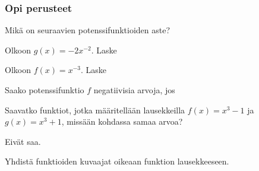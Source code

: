 \begin{tehtavasivu}

\subsubsection*{Opi perusteet}

\begin{tehtava}
Mikä on seuraavien potenssifunktioiden aste?
\begin{vastaus}
\end{vastaus}
\end{tehtava}

\begin{tehtava}
Olkoon $g(x)=-2x^{-2}$. Laske
\begin{vastaus}
\end{vastaus}
\end{tehtava}

\begin{tehtava}
Olkoon $f(x)=x^{-3}$. Laske
\begin{vastaus}
\end{vastaus}
\end{tehtava}

\begin{tehtava}
Saako potenssifunktio $f$ negatiivisia arvoja, jos
\begin{vastaus}
\end{vastaus}
\end{tehtava}

\begin{tehtava}
Saavatko funktiot, jotka määritellään lausekkeilla $f(x)=x^3-1$ ja $g(x)=x^3+1$, missään kohdassa samaa arvoa?
\begin{vastaus}
Eivät saa.
\end{vastaus}
\end{tehtava}

\begin{tehtava}
Yhdistä funktioiden kuvaajat oikeaan funktion lausekkeeseen.


\end{tehtava}
\end{tehtavasivu}
